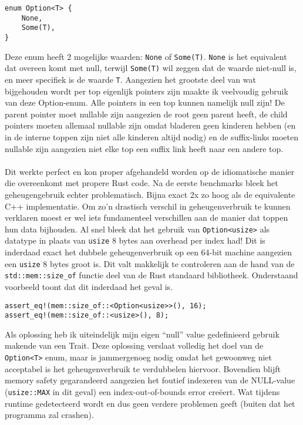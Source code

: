 \begin{verbatim}
enum Option<T> {
    None,
    Some(T),
}
\end{verbatim}

Deze enum heeft 2 mogelijke waarden: \texttt{None} of \texttt{Some(T)}.
\texttt{None} is het equivalent dat overeen komt met null, terwijl \texttt{Some(T)} wil zeggen dat de waarde niet-null is, en meer specifiek is de waarde \texttt{T}.
Aangezien het grootste deel van wat bijgehouden wordt per top eigenlijk pointers zijn maakte ik veelvoudig gebruik van deze Option-enum.
Alle pointers in een top kunnen namelijk null zijn!
De parent pointer moet nullable zijn aangezien de root geen parent heeft, de child pointers moeten allemaal nullable zijn omdat bladeren geen kinderen hebben (en in de interne toppen zijn niet alle kinderen altijd nodig) en de suffix-links moeten nullable zijn aangezien niet elke top een suffix link heeft naar een andere top.
\\ \\
Dit werkte perfect en kon proper afgehandeld worden op de idiomatische manier die overeenkomt met propere Rust code.
Na de eerste benchmarks bleek het geheugengebruik echter problematisch.
Bijna exact 2x zo hoog als de equivalente C++ implementatie.
Om zo'n drastisch verschil in geheugenverbruik te kunnen verklaren moest er wel iets fundamenteel verschillen aan de manier dat toppen hun data bijhouden.
Al snel bleek dat het gebruik van \texttt{Option<usize>} als datatype in plaats van \texttt{usize} 8 bytes aan overhead per index had!
Dit is inderdaad exact het dubbele geheugenverbruik op een 64-bit machine aangezien een \texttt{usize} 8 bytes groot is.
Dit valt makkelijk te controleren aan de hand van de \texttt{std::mem::size\_of} functie deel van de Rust standaard bibliotheek.
Onderstaand voorbeeld toont dat dit inderdaad het geval is.
\begin{verbatim}
assert_eq!(mem::size_of::<Option<usize>>(), 16);
assert_eq!(mem::size_of::<usize>(), 8);
\end{verbatim}

Als oplossing heb ik uiteindelijk mijn eigen ``null'' value gedefinieerd gebruik makende van een Trait.
Deze oplossing verslaat volledig het doel van de \texttt{Option<T>} enum, maar is jammergenoeg nodig omdat het gewoonweg niet acceptabel is het geheugenverbruik te verdubbelen hiervoor.
Bovendien blijft memory safety gegarandeerd aangezien het foutief indexeren van de NULL-value (\texttt{usize::MAX} in dit geval) een index-out-of-bounds error creëert.
Wat tijdens runtime gedetecteerd wordt en dus geen verdere problemen geeft (buiten dat het programma zal crashen).

